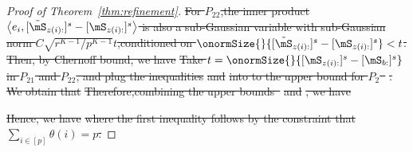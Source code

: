 \documentclass[lettersize,onecolumn,journal]{IEEEtran}
\theoremstyle{definition}
\theoremstyle{definition}
\newcommand{\of}[1]{\left(#1\right)}
\newcommand{\offf}[1]{\left\{#1\right\}}
\newcommand{\ang}[1]{\left\langle#1\right\rangle}
\providecommand{\DIFdeltex}[1]{{\protect\color{red}\sout{#1}}}                      %
\providecommand{\DIFdel}[1]{\texorpdfstring{\DIFdeltex{#1}}{}} %
\begin{document}
\begin{proof}[Proof of Theorem~\ref{thm:refinement}]
\DIFdel{For $P_{22}$,the inner product $ \ang{e_i, [ \tilde  \mS_{z(i):} ]^s - [ \mS_{z(i):} ]^s}$ is also a sub-Gaussian variable with sub-Gaussian norm $ C \sqrt{ r^{K-1}/ p^{K-1} } t$,conditioned on $\onormSize{}{ [ \tilde  \mS_{z(i):} ]^s - [ \mS_{z(i):} ]^s } < t$. Then,  by Chernoff bound, we have 
    }%
\DIFdel{Take $t =  \onormSize{}{ [ \mS_{z(i):}  ]^s - [ \mS_{b:}  ]^s  }$ in $P_{21}$ and $P_{22}$, and plug the inequalities }%
\DIFdel{and }%
\DIFdel{into to the upper bound for $P_2$~}%
\DIFdel{. We obtain that 
    }%
\DIFdel{Therefore,combining the upper bounds~}%
\DIFdel{and }%
\DIFdel{, we have 
    }%

\DIFdel{Hence, we have 
    }%
\DIFdel{where the first inequality follows by the constraint that $\sum_{i \in [p]} \theta(i) = p$.
    }%


\end{proof}
\end{document}
